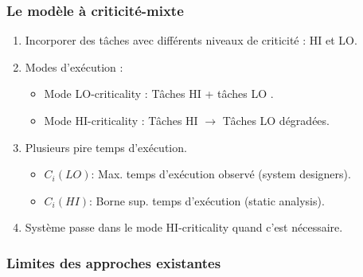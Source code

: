\documentclass[xcolor=table]{beamer}
\begin{document}
\begin{frame}
	\frametitle{Le modèle à criticité-mixte}
	\begin{enumerate}
		
		\item Incorporer des tâches avec différents niveaux de criticité : HI et LO.
		\item Modes d'exécution :
		\begin{itemize}
			\item Mode LO-criticality : Tâches HI  + tâches LO .
			\item Mode HI-criticality : Tâches HI  $\rightarrow$ Tâches LO dégradées.
		\end{itemize}
		\item Plusieurs pire temps d'exécution.
		\begin{itemize}
			\item $C_i(LO)$: Max. temps d'exécution observé (system designers).
			\item $C_i(HI)$: Borne sup. temps d'exécution (static analysis).
		\end{itemize}
		\item Système passe dans le mode HI-criticality quand c'est nécessaire.
	\end{enumerate}	
\end{frame}


\begin{frame}
	\frametitle{Limites des approches existantes}
\end{frame}
\end{document}
